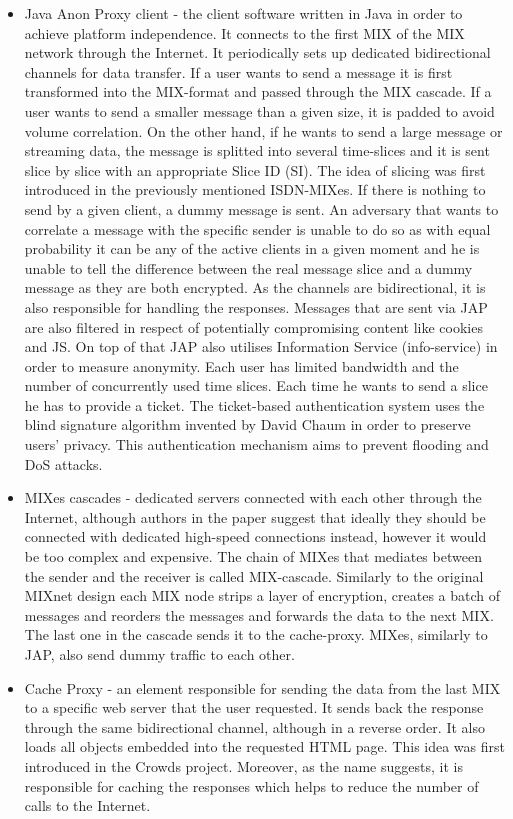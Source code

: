 \begin{itemize}
    \item Java Anon Proxy client - the client software written in Java in order to achieve platform independence. It connects to the first MIX of the MIX network through the Internet. It periodically sets up dedicated bidirectional channels for data transfer. If a user wants to send a message it is first transformed into the MIX-format and passed through the MIX cascade. If a user wants to send a smaller message than a given size, it is padded to avoid volume correlation. On the other hand, if he wants to send a large message or streaming data, the message is splitted into several time-slices and it is sent slice by slice with an appropriate Slice ID (SI). The idea of slicing was first introduced in the previously mentioned ISDN-MIXes. If there is nothing to send by a given client, a dummy message is sent. An adversary that wants to correlate a message with the specific sender is unable to do so as with equal probability it can be any of the active clients in a given moment and he is unable to tell the difference between the real message slice and a dummy message as they are both encrypted. As the channels are bidirectional, it is also responsible for handling the responses. Messages that are sent via JAP are also filtered in respect of potentially compromising content like cookies and JS. On top of that JAP also utilises Information Service (info-service) in order to measure anonymity. Each user has limited bandwidth and the number of concurrently used time slices. Each time he wants to send a slice he has to provide a ticket. The ticket-based authentication system uses the blind signature algorithm invented by David Chaum \cite{blind-signatures} in order to preserve users' privacy. This authentication mechanism aims to prevent flooding and DoS attacks.
    \item MIXes cascades - dedicated servers connected with each other through the Internet, although authors in the paper suggest that ideally they should be connected with dedicated high-speed connections instead, however it would be too complex and expensive. The chain of MIXes that mediates between the sender and the receiver is called MIX-cascade. Similarly to the original MIXnet design each MIX node strips a layer of encryption, creates a batch of messages and reorders the messages and forwards the data to the next MIX. The last one in the cascade sends it to the cache-proxy. MIXes, similarly to JAP, also send dummy traffic to each other.
    \item Cache Proxy - an element responsible for sending the data from the last MIX to a specific web server that the user requested. It sends back the response through the same bidirectional channel, although in a reverse order. It also loads all objects embedded into the requested HTML page. This idea was first introduced in the Crowds project. Moreover, as the name suggests, it is responsible for caching the responses which helps to reduce the number of calls to the Internet.

\end{itemize}
